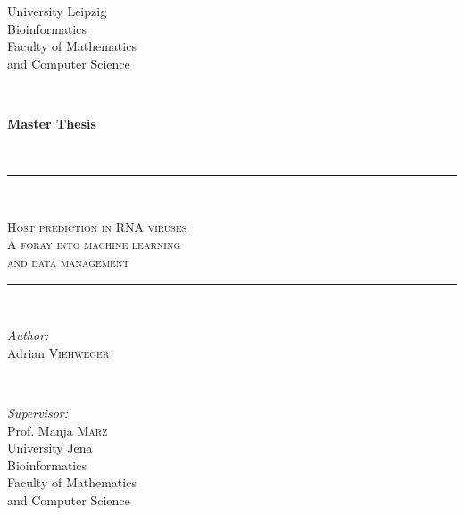\begin{titlepage}

\newcommand{\HRule}{\rule{\linewidth}{0.5mm}}

\center

\begin{minipage}{0.4\textwidth}
\begin{flushleft} \large
    University Leipzig\\
    Bioinformatics\\
    Faculty of Mathematics\\
    and Computer Science\\[2cm]
\end{flushleft}
\end{minipage}
~
\begin{minipage}{0.4\textwidth}
\begin{flushright} \large
\huge \bfseries Master Thesis
\end{flushright}
\end{minipage}\\[3cm]


\color{red-light}\HRule\\[0.5cm]\color{black}

\center
\textsc{\LARGE \color{red-dark}
    Host prediction in RNA viruses\color{black}}\\
\textsc{\large \color{red-mid}
    A foray into machine learning\\and data management\color{black}}\\[0.4cm]

\color{red-light}\HRule\\[3cm]\color{black}


\center

\begin{minipage}[t]{0.4\textwidth}
\begin{flushleft} \large
\emph{Author:}\\
Adrian \textsc{Viehweger}
\end{flushleft}
\end{minipage}
~
\begin{minipage}[t]{0.4\textwidth}
\begin{flushright} \large
\emph{Supervisor:} \\
Prof. Manja \textsc{Marz}\\[0.5cm]
University Jena\\
Bioinformatics\\
Faculty of Mathematics\\and Computer Science
\end{flushright}
\end{minipage}\\[3cm]



\end{titlepage}
